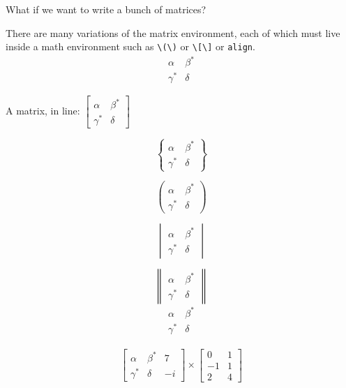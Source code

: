 \documentclass[12pt]{article}
\newenvironment{problem}[2][Problem]
{
	\begin{trivlist} 
		\item[\hskip \labelsep {\bfseries #1 #2:}]
	}
{
	\end{trivlist}
	}
\newenvironment{solution}[1][Solution]
{
	\begin{trivlist} 
		\item[\hskip \labelsep {\itshape #1:}]
	}
	{
	\end{trivlist}
}
\begin{document}
\newpage
\begin{problem}{13}
	What if we want to write a bunch of matrices?
\end{problem}
\begin{solution}
	There are many variations of the matrix environment, each of which must live inside a math environment such as \verb|\(\)| or \verb|\[\]| or \verb|align|.
	\[
	\begin{matrix}
		\alpha& \beta^{*}\\
		\gamma^{*}& \delta
	\end{matrix}
	\]

	A matrix, in line: \(
	\begin{bmatrix}
		\alpha&     \beta^{*}\\
		\gamma^{*}& \delta
	\end{bmatrix}
	\)

	\[	
	\begin{Bmatrix}
		\alpha&     \beta^{*}\\
		\gamma^{*}& \delta
	\end{Bmatrix}
	\]
	
	\[
	\begin{pmatrix}
		\alpha&     \beta^{*}\\
		\gamma^{*}& \delta
	\end{pmatrix}
	\]
	
	\[
	\begin{vmatrix}
		\alpha&     \beta^{*}\\
		\gamma^{*}& \delta
	\end{vmatrix}
	\]
	
	\[
	\begin{Vmatrix}
		\alpha&     \beta^{*}\\
		\gamma^{*}& \delta
	\end{Vmatrix}
	\]
	\[
	\begin{smallmatrix}
		\alpha&     \beta^{*}\\
		\gamma^{*}& \delta
	\end{smallmatrix}
	\]
	
	\begin{align}
		\begin{bmatrix}
			\alpha&     \beta^{*} & 7\\
			\gamma^{*}& \delta & -i
		\end{bmatrix}
		\times
		\begin{bmatrix}
		0&1\\
		-1& 1\\
		2 & 4
		\end{bmatrix}
	\end{align}
\end{solution}
\end{document}
